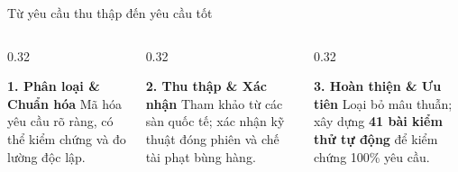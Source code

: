 \documentclass[aspectratio=169, 10pt]{beamer}
\begin{document}
\begin{frame}{Từ yêu cầu thu thập đến yêu cầu tốt}
    \begin{columns}[t]
        \begin{column}{0.32\textwidth}
            \begin{block}{\centering \textbf{1. Phân loại \& Chuẩn hóa}}
                Mã hóa yêu cầu rõ ràng, có thể kiểm chứng và đo lường độc lập.
            \end{block}
        \end{column}
        \begin{column}{0.32\textwidth}
            \begin{block}{\centering \textbf{2. Thu thập \& Xác nhận}}
                Tham khảo từ các sàn quốc tế; xác nhận kỹ thuật đóng phiên và chế tài phạt bùng hàng.
            \end{block}
        \end{column}
        \begin{column}{0.32\textwidth}
            \begin{block}{\centering \textbf{3. Hoàn thiện \& Ưu tiên}}
                Loại bỏ mâu thuẫn; xây dựng \textbf{41 bài kiểm thử tự động} để kiểm chứng 100\% yêu cầu.
            \end{block}
        \end{column}
    \end{columns}
\end{frame}
\end{document}
